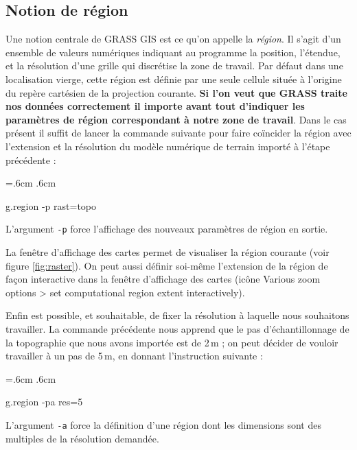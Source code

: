 \documentclass[12pt,oneside]{paper}
\newcommand{\comment}[1]{\marginpar{\begin{flushleft}  #1\end{flushleft}}}
\newenvironment{code}{%
\vspace{2mm}%
\hangindent=.6cm%
\parindent.6cm%
\ttfamily%
\color{gris.3}%
}{
\vspace{2mm}%
}
\begin{document}
\subsection{Notion de région}

Une notion centrale de GRASS GIS est ce qu'on appelle la \emph{région}. Il s'agit d'un ensemble de valeurs numériques indiquant au programme la position, l'étendue, et la résolution d'une grille qui discrétise la zone de travail. Par défaut dans une localisation vierge, cette région est définie par une seule cellule située à l'origine du repère cartésien de la projection courante. \comment{\dbend}\textbf{Si l'on veut que GRASS traite nos données correctement il importe avant tout d'indiquer les paramètres de région correspondant à notre zone de travail}. Dans le cas présent il suffit de lancer la commande suivante pour faire coïncider la région avec l'extension et la résolution du modèle numérique de terrain importé à l'étape précédente :

\begin{code}
g.region -p rast=topo
\end{code}

L'argument \texttt{-p} force l'affichage des nouveaux paramètres de région en sortie.

La fenêtre d'affichage des cartes permet de visualiser la région courante (voir figure \ref{fig:raster}). On peut aussi définir soi-même l'extension de la région de façon interactive dans la fenêtre d'affichage des cartes (icône Various zoom options > set computational region extent interactively).

Enfin est possible, et souhaitable, de fixer la résolution à laquelle nous souhaitons travailler. La commande précédente nous apprend que le pas d'échantillonnage de la topographie que nous avons importée est de 2\,m ; on peut décider de vouloir travailler à un pas de 5\,m, en donnant l'instruction suivante :

\begin{code}
g.region -pa res=5
\end{code}

L'argument \texttt{-a} force la définition d'une région dont les dimensions sont des multiples de la résolution demandée.
\end{document}
